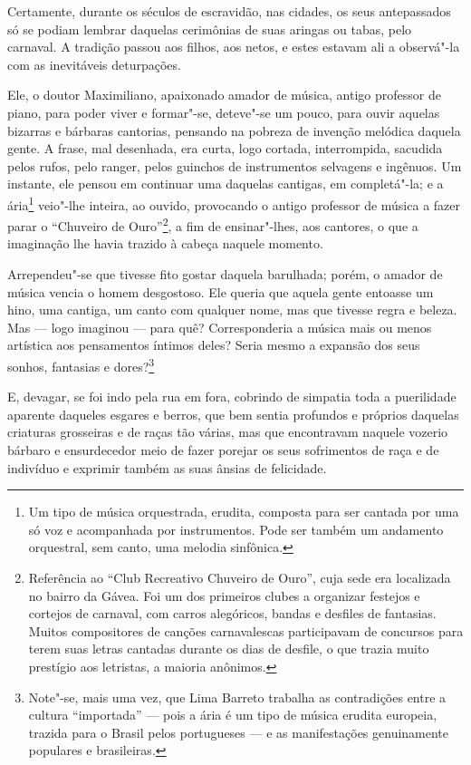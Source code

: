 Certamente, durante os séculos de escravidão, nas cidades, os seus
antepassados só se podiam lembrar daquelas cerimônias de suas aringas ou
tabas, pelo carnaval. A tradição passou aos filhos, aos netos, e estes
estavam ali a observá"-la com as inevitáveis deturpações.

Ele, o doutor Maximiliano, apaixonado amador de música, antigo professor
de piano, para poder viver e formar"-se, deteve"-se um pouco, para ouvir
aquelas bizarras e bárbaras cantorias, pensando na pobreza de invenção
melódica daquela gente. A frase, mal desenhada, era curta, logo cortada,
interrompida, sacudida pelos rufos, pelo ranger, pelos guinchos de
instrumentos selvagens e ingênuos. Um instante, ele pensou em continuar
uma daquelas cantigas, em completá"-la; e a ária\footnote{Um tipo de
  música orquestrada, erudita, composta para ser cantada por uma só voz
  e acompanhada por instrumentos. Pode ser também um andamento
  orquestral, sem canto, uma melodia sinfônica.} veio"-lhe inteira, ao
ouvido, provocando o antigo professor de música a fazer parar o
``Chuveiro de Ouro''\footnote{Referência ao ``Club Recreativo Chuveiro de
  Ouro'', cuja sede era localizada no bairro da Gávea. Foi um dos
  primeiros clubes a organizar festejos e cortejos de carnaval, com
  carros alegóricos, bandas e desfiles de fantasias. Muitos compositores
  de canções carnavalescas participavam de concursos para terem suas
  letras cantadas durante os dias de desfile, o que trazia muito
  prestígio aos letristas, a maioria anônimos.}, a fim de ensinar"-lhes,
aos cantores, o que a imaginação lhe havia trazido à cabeça naquele
momento.

Arrependeu"-se que tivesse fito gostar daquela barulhada; porém, o amador
de música vencia o homem desgostoso. Ele queria que aquela gente
entoasse um hino, uma cantiga, um canto com qualquer nome, mas que
tivesse regra e beleza. Mas --- logo imaginou --- para quê? Corresponderia a
música mais ou menos artística aos pensamentos íntimos deles? Seria
mesmo a expansão dos seus sonhos, fantasias e dores?\footnote{Note"-se,
  mais uma vez, que Lima Barreto trabalha as contradições entre a
  cultura ``importada'' --- pois a ária é um tipo de música erudita
  europeia, trazida para o Brasil pelos portugueses --- e as
  manifestações genuinamente populares e brasileiras.}

E, devagar, se foi indo pela rua em fora, cobrindo de simpatia toda a
puerilidade aparente daqueles esgares e berros, que bem sentia profundos
e próprios daquelas criaturas grosseiras e de raças tão várias, mas que
encontravam naquele vozerio bárbaro e ensurdecedor meio de fazer porejar
os seus sofrimentos de raça e de indivíduo e exprimir também as suas
ânsias de felicidade.

